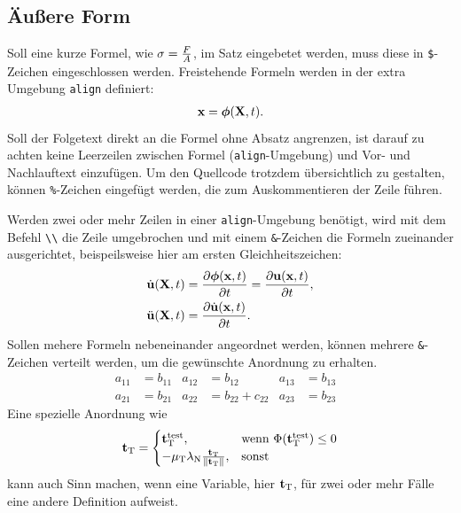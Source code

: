 \subsection{Äußere Form}

Soll eine kurze Formel, wie ${\sigma} = \frac{F}{A}$, im Satz eingebetet werden,
muss diese in \verb+$+-Zeichen eingeschlossen werden. Freistehende Formeln
werden in der extra Umgebung \verb+align+ definiert:
%
\begin{align}
{\mathbf x} = {\boldsymbol \phi} ({\mathbf X},t).
\end{align}
%
Soll der Folgetext direkt an die Formel ohne Absatz angrenzen, ist darauf zu
achten keine Leerzeilen zwischen Formel (\verb+align+-Umgebung) und Vor- und
Nachlauftext einzufügen. Um den Quellcode trotzdem übersichtlich zu gestalten,
können \verb+%+-Zeichen eingefügt werden, die zum Auskommentieren der Zeile
führen.

Werden zwei oder mehr Zeilen in einer \verb+align+-Umgebung benötigt, wird mit
dem Befehl \verb+\\+ die Zeile umgebrochen und mit einem
\verb+&+-Zeichen die Formeln zueinander ausgerichtet, beispeilsweise hier am
ersten Gleichheitszeichen:
%
\begin{align}
\dot{{\mathbf u}}({\mathbf X}, t) &= \frac{{\partial} {\boldsymbol \phi}({\mathbf x}, t)}{{\partial} t}= \frac{{\partial} {\mathbf u}({\mathbf x}, t)}{{\partial} t} ,
\\
\ddot{{\mathbf u}}({\mathbf X}, t) &= \frac{{\partial} \dot{{\mathbf u}}({\mathbf x}, t)}{{\partial} t} .
\end{align}
%
Sollen mehere Formeln nebeneinander angeordnet werden, können mehrere
\verb+&+-Zeichen verteilt werden, um die gewünschte Anordnung zu erhalten.
%
\begin{align}
a_{11}& =b_{11}&
a_{12}& =b_{12}&
a_{13}& =b_{13}&\\
a_{21}& =b_{21}&
a_{22}& =b_{22}+c_{22}&
a_{23}& =b_{23}
\end{align}
%
Eine spezielle Anordnung wie
\begin{align}
{\mathbf t}_{\mathrm{T}} =
\begin{cases}
  {\mathbf t}_{\mathrm{T}}^\text{test},  & \text{wenn } {\Phi}({\mathbf t}_{\mathrm{T}}^\text{test}) \leq 0\\
  - \mu_{\mathrm{T}} {\lambda}_{\mathrm{N}} \frac{{\mathbf t}_{\mathrm{T}}}{\| {\mathbf t}_{\mathrm{T}} \|}, & \text{sonst}
\end{cases}
\end{align}
kann auch Sinn machen, wenn eine Variable, hier ${\mathbf t}_{\mathrm{T}}$, für zwei oder mehr Fälle
eine andere Definition aufweist.

